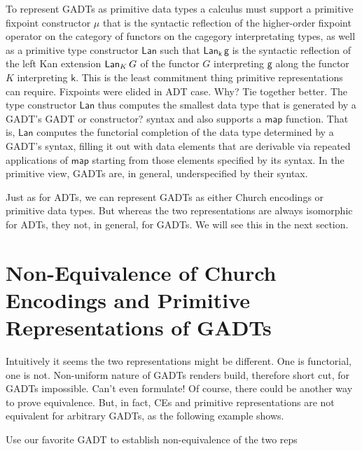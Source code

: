 \documentclass[acmsmall,screen,review,anonymous]{acmart}
\theoremstyle{definition}
\begin{document}
To represent GADTs as primitive data types a calculus must support a
primitive fixpoint constructor $\mathsf{\mu}$ that is the syntactic
reflection of the higher-order fixpoint operator on the category of
functors on the cagegory interpretating types, as well as a primitive
type constructor $\mathsf{Lan}$ such that $\mathsf{Lan_k\,g}$ is the
syntactic reflection of the left Kan extension $\mathsf{Lan}_K \,G$ of the
functor $G$ interpreting $\mathsf{g}$ along the functor $K$
interpreting $\mathsf{k}$. {\color{blue} This is the least commitment
  thing primitive representations can require. Fixpoints were elided
  in ADT case. Why? Tie together better.}  The type constructor
$\mathsf{Lan}$ thus computes the smallest data type that is generated
by a GADT's {\color{blue} GADT or constructor?} syntax and also
supports a $\mathsf{map}$ function. That is, $\mathsf{Lan}$ computes
the functorial completion of the data type determined by a GADT's
syntax, filling it out with data elements that are derivable via
repeated applications of $\mathsf{map}$ starting from those elements
specified by its syntax. In the primitive view, GADTs are, in general,
underspecified by their syntax.

Just as for ADTs, we can represent GADTs as either Church encodings or
primitive data types. But whereas the two representations are always
isomorphic for ADTs, they not, in general, for GADTs. We will see this
in the next section. 

\section{Non-Equivalence of Church Encodings and Primitive
  Representations of GADTs}\label{sec:non-equiv}

Intuitively it seems the two representations might be different. One
is functorial, one is not. Non-uniform nature of GADTs renders build,
therefore short cut, for GADTs impossible. Can't even formulate! Of
course, there could be another way to prove equivalence.  But, in
fact, CEs and primitive representations are not equivalent for
arbitrary GADTs, as the following example shows.

\begin{example}
Use our favorite GADT to establish non-equivalence of the two reps
\end{example}
\end{document}
